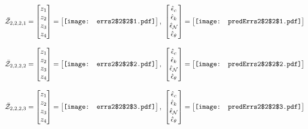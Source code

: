 \documentclass[12pt]{article}
\begin{document}
\begin{gather*}
\bar{\mathcal{Z}}_{2,2,2,1}=\begin{bmatrix}
z_1\\
z_2\\
z_3\\
z_4
 \end{bmatrix}= \begin{bmatrix}
\vcenter{\hbox{\texttt{[image: errs2\$2\$2\$1.pdf]}}}
 \end{bmatrix},\,\, \begin{bmatrix}
\hat{\epsilon}_c\\\hat{\epsilon}_k\\\hat{\epsilon}_\mathcal{N}\\\hat{\epsilon}_\theta
 \end{bmatrix}=\begin{bmatrix}
\vcenter{\hbox{\texttt{[image: predErrs2\$2\$2\$1.pdf]}}}
 \end{bmatrix}
\end{gather*}


\begin{gather*}
\bar{\mathcal{Z}}_{2,2,2,2}=\begin{bmatrix}
z_1\\
z_2\\
z_3\\
z_4
 \end{bmatrix}= \begin{bmatrix}
\vcenter{\hbox{\texttt{[image: errs2\$2\$2\$2.pdf]}}}
 \end{bmatrix},\,\, \begin{bmatrix}
\hat{\epsilon}_c\\\hat{\epsilon}_k\\\hat{\epsilon}_\mathcal{N}\\\hat{\epsilon}_\theta
 \end{bmatrix}=\begin{bmatrix}
\vcenter{\hbox{\texttt{[image: predErrs2\$2\$2\$2.pdf]}}}
 \end{bmatrix}
\end{gather*}


\begin{gather*}
\bar{\mathcal{Z}}_{2,2,2,3}=\begin{bmatrix}
z_1\\
z_2\\
z_3\\
z_4
 \end{bmatrix}= \begin{bmatrix}
\vcenter{\hbox{\texttt{[image: errs2\$2\$2\$3.pdf]}}}
 \end{bmatrix},\,\, \begin{bmatrix}
\hat{\epsilon}_c\\\hat{\epsilon}_k\\\hat{\epsilon}_\mathcal{N}\\\hat{\epsilon}_\theta
 \end{bmatrix}=\begin{bmatrix}
\vcenter{\hbox{\texttt{[image: predErrs2\$2\$2\$3.pdf]}}}
 \end{bmatrix}
\end{gather*}
\end{document}
